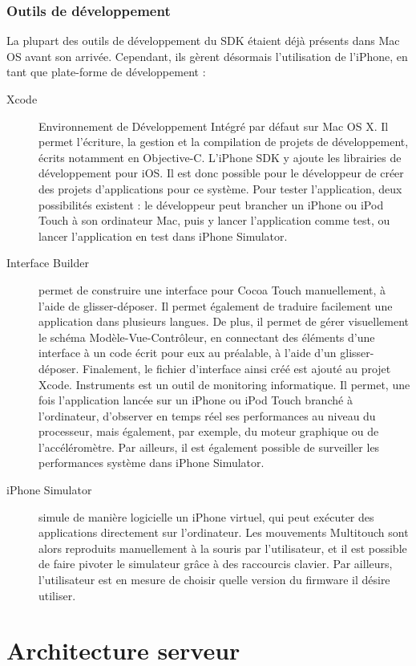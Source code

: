 \documentclass[a4paper,12pt]{report}
\begin{document}
\begin{onehalfspace}
\subsection*{Outils de développement}
La plupart des outils de développement du SDK étaient déjà présents dans Mac OS avant son arrivée. Cependant, ils gèrent désormais l'utilisation de l'iPhone, en tant que plate-forme de développement :
\begin{description}
\item[Xcode] Environnement de Développement Intégré par défaut sur Mac OS X. Il permet l'écriture, la gestion et la compilation de projets de développement, écrits notamment en Objective-C. L'iPhone SDK y ajoute les librairies de développement pour iOS. Il est donc possible pour le développeur de créer des projets d'applications pour ce système. Pour tester l'application, deux possibilités existent : le développeur peut brancher un iPhone ou iPod Touch à son ordinateur Mac, puis y lancer l'application comme test, ou lancer l'application en test dans iPhone Simulator.
\item[Interface Builder] permet de construire une interface pour Cocoa Touch manuellement, à l'aide de glisser-déposer. Il permet également de traduire facilement une application dans plusieurs langues. De plus, il permet de gérer visuellement le schéma Modèle-Vue-Contrôleur, en connectant des éléments d'une interface à un code écrit pour eux au préalable, à l'aide d'un glisser-déposer. Finalement, le fichier d'interface ainsi créé est ajouté au projet Xcode.
Instruments est un outil de monitoring informatique. Il permet, une fois l'application lancée sur un iPhone ou iPod Touch branché à l'ordinateur, d'observer en temps réel ses performances au niveau du processeur, mais également, par exemple, du moteur graphique ou de l'accéléromètre. Par ailleurs, il est également possible de surveiller les performances système dans iPhone Simulator.
\item[iPhone Simulator] simule de manière logicielle un iPhone virtuel, qui peut exécuter des applications directement sur l'ordinateur. Les mouvements Multitouch sont alors reproduits manuellement à la souris par l'utilisateur, et il est possible de faire pivoter le simulateur grâce à des raccourcis clavier. Par ailleurs, l'utilisateur est en mesure de choisir quelle version du firmware il désire utiliser.
\end{description}

\chapter*{Architecture serveur}


\end{onehalfspace}
\end{document}
